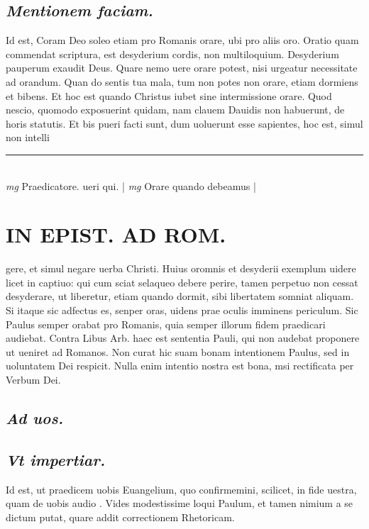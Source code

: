 \documentclass{article}
\begin{document}
\begin{pages}
\subsection*{\textit{Mentionem faciam. }}\pstart Id est, Coram Deo soleo etiam pro Romanis orare, ubi pro aliis oro. Oratio quam commendat scriptura, est desyderium cordis, non multiloquium. Desyderium pauperum exaudit Deus. Quare nemo uere orare potest, nisi urgeatur necessitate ad orandum. Quan do sentis tua mala, tum non potes non orare, etiam dormiens et bibens. Et hoc est quando Christus iubet sine intermissione orare. Quod nescio, quomodo exposuerint quidam, nam clauem Dauidis non habuerunt, de horis statutis. Et bis pueri facti sunt, dum uoluerunt esse sapientes, hoc est, simul non intelli\pend
\vspace{0.5cm}\noindent
\vspace{0.2cm}\rule{1cm}{0.2pt}\\ 
\hspace{0.2cm}\textit{mg}
\footnotesize Praedicatore. ueri qui. 
\normalsize| 
\hspace{0.2cm}\textit{mg}
\footnotesize Orare quando debeamus 
\normalsize| 
\section*{IN EPIST. AD ROM.  }
\marginpar{[ p.9 ]}\pstart gere, et simul negare uerba Christi. Huius oromnis et desyderii exemplum uidere licet in captiuo: qui cum sciat selaqueo debere perire, tamen perpetuo non cessat desyderare, ut liberetur, etiam quando dormit, sibi libertatem somniat aliquam. Si itaque sic adfectus es, senper oras, uidens prae oculis imminens periculum. Sic Paulus semper orabat pro Romanis, quia semper illorum fidem praedicari audiebat.   \pend\pstart Contra Libus Arb. haec est sententia Pauli, qui non audebat proponere ut ueniret ad Romanos. Non curat hic suam bonam intentionem Paulus, sed in uoluntatem Dei respicit. Nulla enim intentio nostra est bona, msi rectificata per Verbum Dei.   \pend
{}
{}
\subsection*{\textit{Ad uos. }}
{}
\subsection*{\textit{Vt impertiar. }}\pstart Id est, ut praedicem uobis Euangelium, quo confirmemini, scilicet, in fide uestra, quam de uobis audio . Vides modestissime loqui Paulum, et tamen nimium a se dictum putat, quare addit correctionem Rhetoricam.  \pend
{}
{}

\end{pages}
\end{document}
